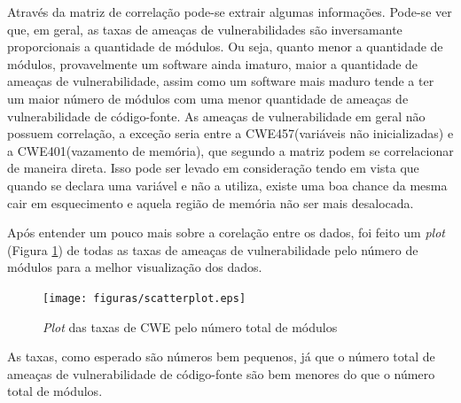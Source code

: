 \begin{table}[h]
\centering
{}
\caption{Matriz de correlação.}
\label{tab:correlacao}
\end{table}

Através da matriz de correlação pode-se extrair algumas informações. Pode-se ver
que, em geral, as taxas de ameaças de vulnerabilidades são inversamante
proporcionais a quantidade de módulos. Ou seja, quanto menor a quantidade de
módulos, provavelmente um software ainda imaturo, maior a quantidade de ameaças
de vulnerabilidade, assim como um software mais maduro tende a ter um maior
número de módulos com uma menor quantidade de ameaças de vulnerabilidade de
código-fonte. As ameaças de vulnerabilidade em geral não possuem correlação, a
exceção seria entre a CWE457(variáveis não inicializadas) e a CWE401(vazamento
de memória), que segundo a matriz podem se correlacionar de maneira direta. Isso
pode ser levado em consideração tendo em vista que quando se declara uma
variável e não a utiliza, existe uma boa chance da mesma cair em esquecimento e
aquela região de memória não ser mais desalocada.

Após entender um pouco mais sobre a corelação entre os dados, foi feito um
\textit{plot} (Figura \ref{fig:scatterplot}) de todas as taxas de ameaças
de vulnerabilidade pelo número de módulos para a melhor visualização dos dados.

\begin{figure}[h]
  \centering
  \texttt{[image: figuras/scatterplot.eps]}
      \caption{\textit{Plot} das taxas de CWE pelo número total de módulos}
  \label{fig:scatterplot}
\end{figure}

As taxas, como esperado são números bem pequenos, já que o número total de
ameaças de vulnerabilidade de código-fonte são bem menores do que o número total
de módulos.

